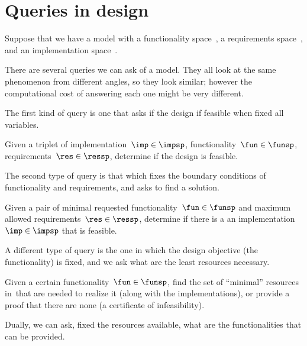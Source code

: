 

\section{Queries in design}


Suppose that we have a model with a functionality space~\funsp, a requirements space~\ressp, and an implementation space~\impsp.

There are several queries we can ask of a model. They all look at the same phenomenon from different angles, so they look similar; however the computational cost of answering each one might be very different.

The first kind of query is one that asks if the design if feasible when fixed all variables.

\begin{problem}
    Given a triplet of implementation~$\imp\in\impsp$, functionality~$\fun\in\funsp$, requirements~$\res\in\ressp$, determine if the design is feasible.
\end{problem}

The second type of query is that which fixes the boundary conditions of functionality and requirements, and asks to find a solution.

\begin{problem}
    Given a pair of minimal requested functionality~$\fun\in\funsp$ and maximum allowed requirements~$\res\in\ressp$, determine if there is a an implementation~$\imp\in\impsp$ that is feasible.
\end{problem}

A different type of query is the one in which the design objective (the functionality)
is fixed, and we ask what are the least resources necessary.


\begin{problem}[FixFunMinRes]\label{pro:FixFunMinRes}
    Given a certain functionality~$\fun\in\funsp$, find the set of ``minimal'' resources in~\ressp that are needed to realize it (along with the implementations), or provide a proof that there are none (a certificate of infeasibility).
\end{problem}


Dually, we can ask, fixed the resources available, what are the functionalities that can be provided.

